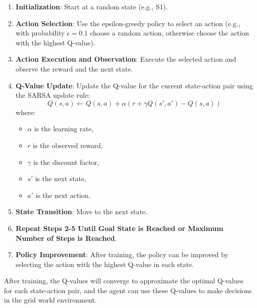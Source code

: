 \documentclass{article}
\begin{document}
\begin{enumerate}
    \item \textbf{Initialization}: Start at a random state (e.g., S1).
    \item \textbf{Action Selection}: Use the epsilon-greedy policy to select an action (e.g., with probability $\epsilon = 0.1$ choose a random action, otherwise choose the action with the highest Q-value).
    \item \textbf{Action Execution and Observation}: Execute the selected action and observe the reward and the next state.
    \item \textbf{Q-Value Update}: Update the Q-value for the current state-action pair using the SARSA update rule:
    \[
    Q(s, a) \leftarrow Q(s, a) + \alpha \left( r + \gamma Q(s', a') - Q(s, a) \right)
    \]
    where:
    \begin{itemize}
        \item $\alpha$ is the learning rate,
        \item $r$ is the observed reward,
        \item $\gamma$ is the discount factor,
        \item $s'$ is the next state,
        \item $a'$ is the next action.
    \end{itemize}
    \item \textbf{State Transition}: Move to the next state.
    \item \textbf{Repeat Steps 2-5 Until Goal State is Reached or Maximum Number of Steps is Reached}.
    \item \textbf{Policy Improvement}: After training, the policy can be improved by selecting the action with the highest Q-value in each state.
\end{enumerate}

After training, the Q-values will converge to approximate the optimal Q-values for each state-action pair, and the agent can use these Q-values to make decisions in the grid world environment.
\end{document}
